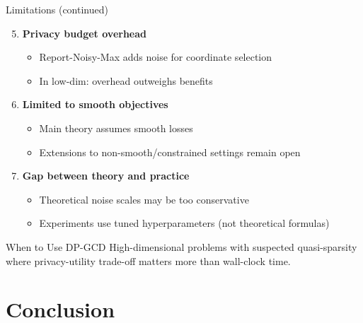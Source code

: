 \documentclass[10pt]{beamer}
\begin{document}
\begin{frame}{Limitations (continued)}
\begin{enumerate}
\setcounter{enumi}{4}
\item \textbf{Privacy budget overhead}
\begin{itemize}
\item Report-Noisy-Max adds noise for coordinate selection
\item In low-dim: overhead outweighs benefits
\end{itemize}

\item \textbf{Limited to smooth objectives}
\begin{itemize}
\item Main theory assumes smooth losses
\item Extensions to non-smooth/constrained settings remain open
\end{itemize}

\item \textbf{Gap between theory and practice}
\begin{itemize}
\item Theoretical noise scales may be too conservative
\item Experiments use tuned hyperparameters (not theoretical formulas)
\end{itemize}
\end{enumerate}

\vspace{1em}
\begin{block}{When to Use DP-GCD}
High-dimensional problems with suspected quasi-sparsity where privacy-utility trade-off matters more than wall-clock time.
\end{block}
\end{frame}

\section{Conclusion}
\end{document}
